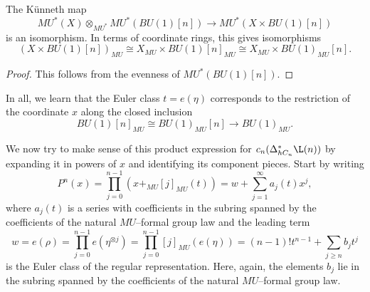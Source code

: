\begin{corollary}
The K\"unneth map \[MU^*(X) \otimes_{MU^*} MU^*(BU(1)[n]) \to MU^*(X \times BU(1)[n])\] is an isomorphism.  In terms of coordinate rings, this gives isomorphisms \[(X \times BU(1)[n])_{MU} \cong X_{MU} \times BU(1)[n]_{MU} \cong X_{MU} \times BU(1)_{MU}[n].\]
\end{corollary}
\begin{proof}
This follows from the evenness of $MU^*(BU(1)[n])$.
\end{proof}

\noindent In all, we learn that the Euler class $t = e(\eta)$ corresponds to the restriction of the coordinate $x$ along the closed inclusion \[BU(1)[n]_{MU} \cong BU(1)_{MU}[n] \to BU(1)_{MU}.\]

We now try to make sense of this product expression for $c_n(\Delta_{hC_n}^* \L(n))$ by expanding it in powers of $x$ and identifying its component pieces.  Start by writing \[P^n(x) = \prod_{j=0}^{n-1} (x +_{MU} [j]_{MU}(t)) = w + \sum_{j=1}^\infty a_j(t) x^j,\] where $a_j(t)$ is a series with coefficients in the subring spanned by the coefficients of the natural $MU$--formal group law and the leading term \[w = e(\rho) = \prod_{j=0}^{n-1} e(\eta^{\otimes j}) = \prod_{j=0}^{n-1} [j]_{MU} (e(\eta)) = (n-1)! t^{n-1} + \sum_{j \ge n} b_j t^j\] is the Euler class of the regular representation.  Here, again, the elements $b_j$ lie in the subring spanned by the coefficients of the natural $MU$--formal group law.

